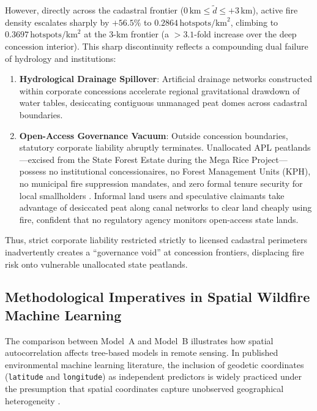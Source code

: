 However, directly across the cadastral frontier ($0\,\text{km} \le \tilde{d} \le +3$\,km), active fire density escalates sharply by $+56.5\%$ to $0.2864\,\text{hotspots}/\text{km}^2$, climbing to $0.3697\,\text{hotspots}/\text{km}^2$ at the 3-km frontier (a $>3.1$-fold increase over the deep concession interior). This sharp discontinuity reflects a compounding dual failure of hydrology and institutions:
\begin{enumerate}
    \item \textbf{Hydrological Drainage Spillover}: Artificial drainage networks constructed within corporate concessions accelerate regional gravitational drawdown of water tables, desiccating contiguous unmanaged peat domes across cadastral boundaries.
    \item \textbf{Open-Access Governance Vacuum}: Outside concession boundaries, statutory corporate liability abruptly terminates. Unallocated APL peatlands---excised from the State Forest Estate during the Mega Rice Project---possess no institutional concessionaires, no Forest Management Units (KPH), no municipal fire suppression mandates, and zero formal tenure security for local smallholders \citep{Cattau2016GCB, Putranto2023LandUsePol}. Informal land users and speculative claimants take advantage of desiccated peat along canal networks to clear land cheaply using fire, confident that no regulatory agency monitors open-access state lands.
\end{enumerate}

Thus, strict corporate liability restricted strictly to licensed cadastral perimeters inadvertently creates a ``governance void'' at concession frontiers, displacing fire risk onto vulnerable unallocated state peatlands.

\subsection{Methodological Imperatives in Spatial Wildfire Machine Learning}
\label{subsec:disc_spatial_ml}

The comparison between Model~A and Model~B illustrates how spatial autocorrelation affects tree-based models in remote sensing. In published environmental machine learning literature, the inclusion of geodetic coordinates (\texttt{latitude} and \texttt{longitude}) as independent predictors is widely practiced under the presumption that spatial coordinates capture unobserved geographical heterogeneity \citep{Meyer2018EcolModel, Dormann2007Ecography}.

